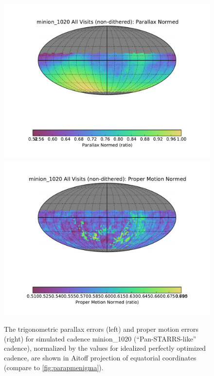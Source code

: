 \begin{figure}[t!]
\vskip -0.03in
\includegraphics[angle=0,width=0.49\hsize:,clip]{figs/cadence/minion_1020_Parallax_Normed_All_Visits_non-dithered_HEAL_SkyMap.pdf}
\includegraphics[angle=0,width=0.49\hsize:,clip]{figs/cadence/minion_1020_Proper_Motion_Normed_All_Visits_non-dithered_HEAL_SkyMap.pdf}
\vskip -0.2in
\caption{The trigonometric parallax errors (left) and proper motion errors (right)  for simulated cadence
minion\_1020 (``Pan-STARRS-like'' cadence), normalized by the values for idealized perfectly optimized
cadence, are shown in Aitoff projection of equatorial coordinates (compare to \autoref{fig:parapmenigma}).}
\label{fig:parapmenigma2}
\end{figure}

